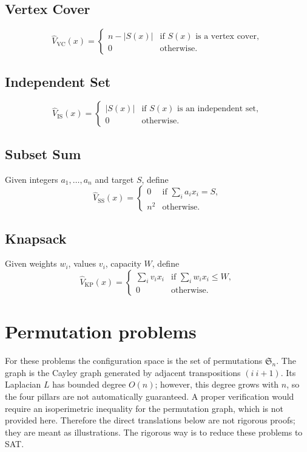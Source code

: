 \documentclass[11pt,a4paper]{article}
\begin{document}
\subsection{Vertex Cover}
\[
\hat{V}_{\mathrm{VC}}(x) = \begin{cases}
n - |S(x)| & \text{if } S(x) \text{ is a vertex cover},\\
0 & \text{otherwise}.
\end{cases}
\]

\subsection{Independent Set}
\[
\hat{V}_{\mathrm{IS}}(x) = \begin{cases}
|S(x)| & \text{if } S(x) \text{ is an independent set},\\
0 & \text{otherwise}.
\end{cases}
\]

\subsection{Subset Sum}
Given integers $a_1,\ldots,a_n$ and target $S$, define
\[
\hat{V}_{\mathrm{SS}}(x) = \begin{cases}
0 & \text{if } \sum_{i} a_i x_i = S,\\
n^2 & \text{otherwise}.
\end{cases}
\]

\subsection{Knapsack}
Given weights $w_i$, values $v_i$, capacity $W$, define
\[
\hat{V}_{\mathrm{KP}}(x) = \begin{cases}
\sum_i v_i x_i & \text{if } \sum_i w_i x_i \le W,\\
0 & \text{otherwise}.
\end{cases}
\]

\section{Permutation problems}

For these problems the configuration space is the set of permutations $\mathfrak{S}_n$. The graph is the Cayley graph generated by adjacent transpositions $(i\ i+1)$. Its Laplacian $L$ has bounded degree $O(n)$; however, this degree grows with $n$, so the four pillars are not automatically guaranteed. A proper verification would require an isoperimetric inequality for the permutation graph, which is not provided here. Therefore the direct translations below are not rigorous proofs; they are meant as illustrations. The rigorous way is to reduce these problems to SAT.
\end{document}
